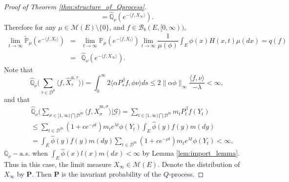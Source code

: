 \documentclass[12pt,a4paper]{amsart}
\numberwithin{equation}{section}
\theoremstyle{plain}
\theoremstyle{definition}
\begin{document}
\begin{proof}[Proof of Theorem \ref{thm:structure_of_Qprocess}]
\begin{equation*}
    =\widehat{\mathbb Q}_{\nu}\left(e^{-\langle f, X_{\infty}\rangle }\right).
  \end{equation*}
  Therefore for any $\mu\in\mathcal M(E)\setminus\{0\}$, and $f\in\mathcal B_b(E,[0,\infty))$,
  \begin{eqnarray*}
    \lim_{t\rightarrow\infty}\widetilde{\mathbb P}_\mu\left(e^{-\langle f, X_t\rangle}\right)&=&\lim_{t\rightarrow\infty}\mathbb P_\mu\left(e^{-\langle f, X_t\rangle}\right)
                                                                                                 \lim_{t\to\infty}\dfrac{1}{\mu(\phi)}\int_E\phi(x)H(x, t)\mu(dx)=q(f)\\
                                                                                             &=&\widehat{\mathbb Q}_{\nu}\left(e^{-\langle f, X_{\infty}\rangle }\right).
  \end{eqnarray*}
  Note that
  \[
    \widehat{\mathbb Q}_{\nu}\big(\sum_{\tau\in \mathcal D^{\mathrm n}}\langle f, \widehat X_{\tau}^{{\mathrm n},\tau} \rangle \big)=\int_0^\infty2\langle \alpha P^{\beta}_sf,\phi\nu\rangle ds
    \leq 2\|\alpha\phi\|_\infty\dfrac{\langle f,\nu\rangle }{-\lambda}<\infty,
  \]
  and that
  \begin{eqnarray*}
    &&\widehat{\mathbb Q}_{\nu}\Big(\sum_{\sigma\in [1,\infty)\bigcap\mathcal D^{\mathrm m}}\langle f, \widehat X_{\sigma}^{{\mathrm m},\sigma} \rangle|\mathcal G \Big)
       =\sum_{t\in [1,\infty)\bigcap\mathcal D^{\mathrm m}}m_tP^{\beta}_tf( Y_t)\\
    &&\leq \sum_{t\in \mathcal D^{\mathrm m}}(1+ce^{-\rho t})m_te^{\lambda t}
       \phi(Y_t)\int_E\widehat\phi(y)f(y)m(dy)\\
    &&=\int_E\widehat\phi(y)f(y)m(dy) \sum_{t\in \mathcal D^{\mathrm m}}(1+ce^{-\rho t})m_te^{\lambda t}\phi(Y_t)<\infty,
  \end{eqnarray*}
  $\mathbb Q_{\nu}-{\mathrm a.s.}$ when $\int_E\widehat\phi(x)l(x)m(dx)<\infty$ by Lemma \ref{lem:import_lemma}.
  Thus in this case, the limit measure $X_\infty\in \mathcal M(E)$.  Denote the distribution of $X_\infty$ by $\mathbf P$.  Then $\mathbf P$
  is the invariant probability of the $Q$-process.



\end{proof}
\end{document}
